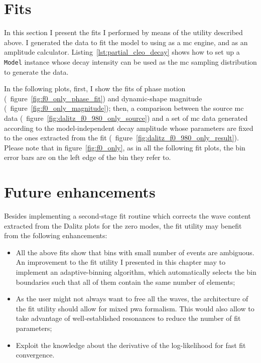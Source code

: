     \section{Fits}

    In this section I present the fits I performed by means of the utility described above.
    I generated the data to fit the model to using  as a \ac{mc} engine, and  as an amplitude calculator.
    Listing~\ref{lst:partial_cleo_decay} shows how to set up a \lstinline!Model! instance whose decay intensity can be used as the \ac{mc} sampling distribution to generate the data.


    In the following plots, first, I show the fits of phase motion (\eg~figure~\ref{fig:f0_only_phase_fit}) and dynamic-shape magnitude (\eg~figure~\ref{fig:f0_only_magnitude});
    then, a comparison between the source \ac{mc} data (\eg~figure~\ref{fig:dalitz_f0_980_only_source}) and a set of \ac{mc} data generated according to the model-independent decay amplitude whose parameters are fixed to the ones extracted from the fit (\eg~figure~\ref{fig:dalitz_f0_980_only_result}).
    Please note that in figure~\ref{fig:f0_only}, as in all the following fit plots, the bin error bars are on the left edge of the bin they refer to.


    
    
    

    \section{Future enhancements}

    Besides implementing a second-stage fit routine which corrects the wave content extracted from the Dalitz plots for the zero modes, the fit utility may benefit from the following enhancements:

    \begin{itemize}
        \item
            All the above fits show that bins with small number of events are ambiguous.
            An improvement to the fit utility I presented in this chapter may to implement an adaptive-binning algorithm, which automatically selects the bin boundaries such that all of them contain the same number of elements;


        \item
            As the user might not always want to free all the waves, the architecture of the fit utility should allow for mixed \ac{pwa} formalism. This would also allow to take advantage of well-established resonances to reduce the number of fit parameters;

        \item
            Exploit the knowledge about the derivative of the log-likelihood for fast fit convergence.
    \end{itemize}
